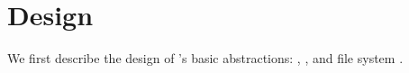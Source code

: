 \section{Design}
\label{sec:design}

We first describe the design of \Kudos's basic abstractions: \bdescs,
\chdescs, and file system \modules.



